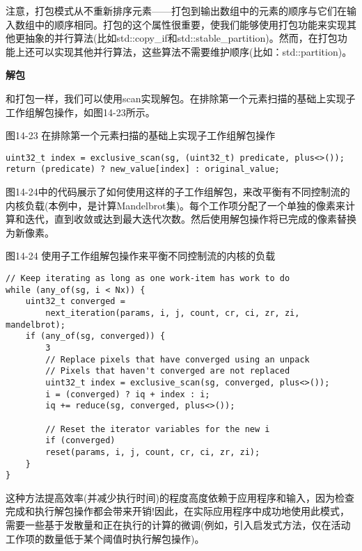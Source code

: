 注意，打包模式从不重新排序元素——打包到输出数组中的元素的顺序与它们在输入数组中的顺序相同。打包的这个属性很重要，使我们能够使用打包功能来实现其他更抽象的并行算法(比如std::copy\_if和std::stable\_partition)。然而，在打包功能上还可以实现其他并行算法，这些算法不需要维护顺序(比如：std::partition)。\par

\hspace*{\fill} \par %
\textbf{解包}

和打包一样，我们可以使用scan实现解包。在排除第一个元素扫描的基础上实现子工作组解包操作，如图14-23所示。\par

\hspace*{\fill} \par %
图14-23 在排除第一个元素扫描的基础上实现子工作组解包操作
\begin{lstlisting}[caption={}]
uint32_t index = exclusive_scan(sg, (uint32_t) predicate, plus<>());
return (predicate) ? new_value[index] : original_value;
\end{lstlisting}

图14-24中的代码展示了如何使用这样的子工作组解包，来改平衡有不同控制流的内核负载(本例中，是计算Mandelbrot集)。每个工作项分配了一个单独的像素来计算和迭代，直到收敛或达到最大迭代次数。然后使用解包操作将已完成的像素替换为新像素。\par

\hspace*{\fill} \par %
图14-24 使用子工作组解包操作来平衡不同控制流的内核的负载
\begin{lstlisting}[caption={}]
// Keep iterating as long as one work-item has work to do
while (any_of(sg, i < Nx)) {
	uint32_t converged =
		next_iteration(params, i, j, count, cr, ci, zr, zi, mandelbrot);
	if (any_of(sg, converged)) {
		3
		// Replace pixels that have converged using an unpack
		// Pixels that haven't converged are not replaced
		uint32_t index = exclusive_scan(sg, converged, plus<>());
		i = (converged) ? iq + index : i;
		iq += reduce(sg, converged, plus<>());
		
		// Reset the iterator variables for the new i
		if (converged)
		reset(params, i, j, count, cr, ci, zr, zi);
	}
}
\end{lstlisting}

这种方法提高效率(并减少执行时间)的程度高度依赖于应用程序和输入，因为检查完成和执行解包操作都会带来开销!因此，在实际应用程序中成功地使用此模式，需要一些基于发散量和正在执行的计算的微调(例如，引入启发式方法，仅在活动工作项的数量低于某个阈值时执行解包操作)。\par






















